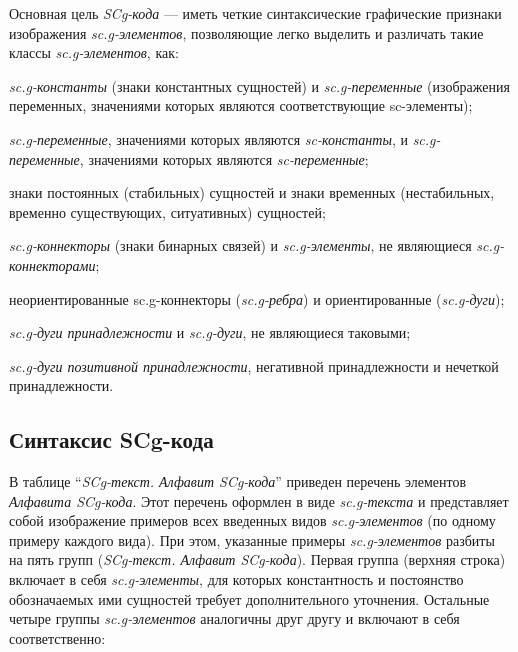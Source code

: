 Основная цель \textit{SCg-кода} --- иметь четкие синтаксические графические признаки изображения \textit{sc.g-элементов}, позволяющие легко выделить и различать такие классы \textit{sc.g-элементов}, как:
\begin{textitemize}
	\item \textit{sc.g-константы} (знаки константных сущностей) и \textit{sc.g-переменные} (изображения переменных, значениями которых являются соответствующие sc-элементы);
	\item \textit{sc.g-переменные}, значениями которых являются \textit{sc-константы}, и \textit{sc.g-переменные}, значениями которых являются \textit{sc-переменные};
	\item знаки постоянных (стабильных) сущностей и знаки временных (нестабильных, временно существующих, ситуативных) сущностей;
	\item \textit{sc.g-коннекторы} (знаки бинарных связей) и \textit{sc.g-элементы}, не являющиеся \textit{sc.g-коннекторами};
	\item неориентированные sc.g-коннекторы (\textit{sc.g-ребра}) и ориентированные (\textit{sc.g-дуги});
	\item \textit{sc.g-дуги принадлежности} и \textit{sc.g-дуги}, не являющиеся таковыми;
	\item \textit{sc.g-дуги позитивной принадлежности}, негативной принадлежности и нечеткой принадлежности.
\end{textitemize}

\subsection{Синтаксис SCg-кода}
\label{sec_scg_syntax}

\begin{SCn}
\end{SCn}

В таблице ``\textit{SCg-текст. Алфавит SCg-кода\scnsupergroupsign}'' приведен перечень элементов \textit{Алфавита SCg-кода\scnsupergroupsign}.
Этот перечень оформлен в виде \textit{sc.g-текста} и представляет собой изображение примеров всех введенных видов \textit{sc.g-элементов} (по одному примеру каждого вида). При этом, указанные примеры \textit{sc.g-элементов} разбиты на пять групп (\textit{SCg-текст. Алфавит SCg-кода\scnsupergroupsign}). Первая группа (верхняя строка) включает в себя \textit{sc.g-элементы}, для которых константность и постоянство обозначаемых ими сущностей требует дополнительного уточнения. Остальные четыре группы \textit{sc.g-элементов} аналогичны друг другу и включают в себя соответственно:

